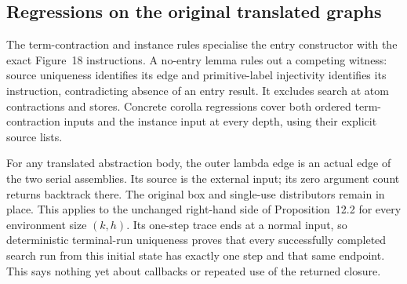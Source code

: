 
\subsection{Regressions on the original translated graphs}

The term-contraction and instance rules specialise the entry constructor
with the exact Figure~18 instructions. A no-entry lemma rules out a competing
witness: source uniqueness identifies its edge and primitive-label injectivity
identifies its instruction, contradicting absence of an entry result. It
excludes search at atom contractions and stores. Concrete corolla regressions
cover both ordered term-contraction inputs and the instance input at every
depth, using their explicit source lists.








For any translated abstraction body, the outer lambda edge is an actual
edge of the two serial assemblies. Its source is the external input; its
zero argument count returns backtrack there. The original box and single-use
distributors remain in place. This applies to the unchanged right-hand side
of Proposition~12.2 for every environment size $(k,h)$. Its one-step trace
ends at a normal input, so deterministic terminal-run uniqueness proves that
every successfully completed search run from this initial state has exactly
one step and that same endpoint. This says nothing yet about callbacks or
repeated use of the returned closure.




